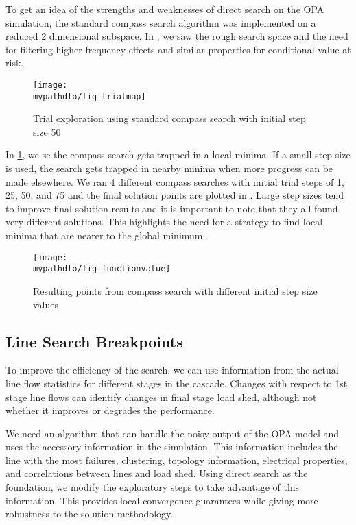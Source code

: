 To get an idea of the strengths and weaknesses of direct search on the OPA simulation, the standard compass search algorithm was implemented on a reduced 2 dimensional subspace. In , we saw the rough search space and the need for filtering higher frequency effects and similar properties for conditional value at risk.
\begin{figure}
\centering
\texttt{[image: \\mypathdfo/fig-trialmap]}
\caption{Trial exploration using standard compass search with initial step size 50}\label{fig:trialmap}
\end{figure}
In \cref{fig:trialmap}, we se the compass search gets trapped in a local minima.  If a small step size is used, the search gets trapped in nearby minima when more progress can be made elsewhere.   We ran 4 different compass searches with initial trial steps of 1, 25, 50, and 75 and the final solution points are plotted in .  Large step sizes tend to improve final solution results and it is important to note that they all found very different solutions. This highlights the need for a strategy to find local minima that are nearer to the global minimum. 
\begin{figure}
\centering
\texttt{[image: \\mypathdfo/fig-functionvalue]}
\caption{Resulting points from compass search with different initial step size values}\label{fig:functionvalue}
\end{figure}











\subsection{Line Search Breakpoints}

To improve the efficiency of the search, we can use information from the actual line flow statistics for different stages in the cascade.  Changes with respect to 1st stage line flows can identify changes in final stage load shed, although not whether it improves or degrades the performance.


We need an algorithm that can handle the noisy output of the OPA model and uses the accessory information in the simulation.  This information includes the line with the most failures, clustering, topology information, electrical properties, and correlations between lines and load shed. Using direct search as the foundation, we modify the exploratory steps to take advantage of this information.  This provides local convergence guarantees while giving more robustness to the solution methodology.


